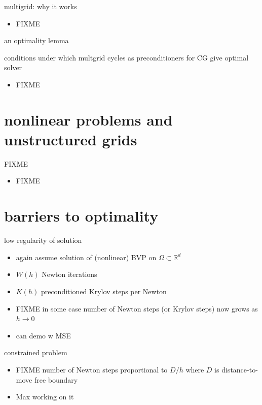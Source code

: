 \documentclass[hide notes,intlimits,usenames,dvipsnames]{beamer}
\newcommand{\RR}{\mathbb{R}}
\begin{document}
\begin{frame}{multigrid: why it works}
\begin{itemize}
\item FIXME
\end{itemize}
\end{frame}


\begin{frame}{an optimality lemma}

conditions under which multgrid cycles as preconditioners for CG give optimal solver
\begin{itemize}
\item FIXME
\end{itemize}
\end{frame}


\section{nonlinear problems and unstructured grids}

\begin{frame}{FIXME}
\begin{itemize}
\item FIXME
\end{itemize}
\end{frame}



\section{barriers to optimality}


\begin{frame}{low regularity of solution}
\begin{itemize}
\item again assume solution of (nonlinear) BVP on $\Omega \subset \RR^d$
\item $W(h)$ Newton iterations
\item $K(h)$ preconditioned Krylov steps per Newton
\item FIXME  in some case number of Newton steps (or Krylov steps) now grows as $h\to 0$
\item can demo w MSE
\end{itemize}
\end{frame}


\begin{frame}{constrained problem}
\begin{itemize}
\item FIXME  number of Newton steps proportional to $D/h$ where $D$ is distance-to-move free boundary
\item Max working on it
\end{itemize}
\end{frame}
\end{document}
